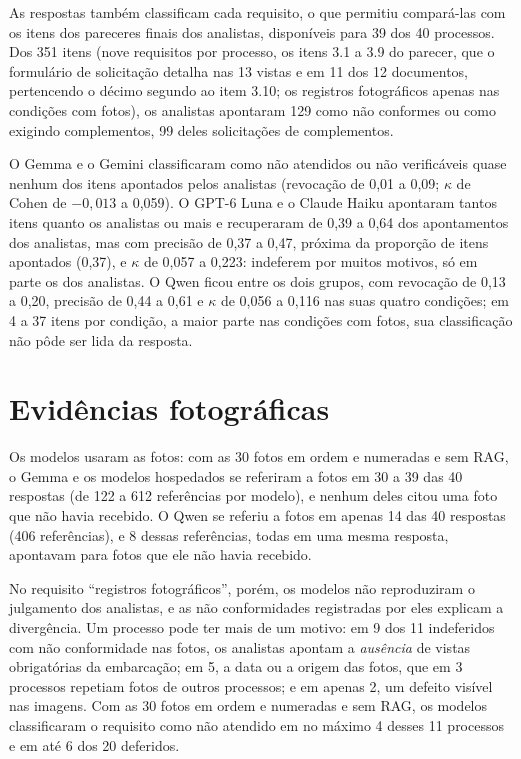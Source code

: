 As respostas também classificam cada requisito, o que permitiu compará-las com os itens dos pareceres finais dos analistas, disponíveis para 39 dos 40 processos. Dos 351 itens (nove requisitos por processo, os itens 3.1 a 3.9 do parecer, que o formulário de solicitação detalha nas 13 vistas e em 11 dos 12 documentos, pertencendo o décimo segundo ao item 3.10; os registros fotográficos apenas nas condições com fotos), os analistas apontaram 129 como não conformes ou como exigindo complementos, 99 deles solicitações de complementos.

O Gemma e o Gemini classificaram como não atendidos ou não verificáveis quase nenhum dos itens apontados pelos analistas (revocação de 0,01 a 0,09; $\kappa$ de Cohen \cite{Cohen1960} de $-0{,}013$ a 0,059). O GPT-6 Luna e o Claude Haiku apontaram tantos itens quanto os analistas ou mais e recuperaram de 0,39 a 0,64 dos apontamentos dos analistas, mas com precisão de 0,37 a 0,47, próxima da proporção de itens apontados (0,37), e $\kappa$ de 0,057 a 0,223: indeferem por muitos motivos, só em parte os dos analistas. O Qwen ficou entre os dois grupos, com revocação de 0,13 a 0,20, precisão de 0,44 a 0,61 e $\kappa$ de 0,056 a 0,116 nas suas quatro condições; em 4 a 37 itens por condição, a maior parte nas condições com fotos, sua classificação não pôde ser lida da resposta.

\section{Evidências fotográficas}
\label{sec:fotos}

Os modelos usaram as fotos: com as 30 fotos em ordem e numeradas e sem RAG, o Gemma e os modelos hospedados se referiram a fotos em 30 a 39 das 40 respostas (de 122 a 612 referências por modelo), e nenhum deles citou uma foto que não havia recebido. O Qwen se referiu a fotos em apenas 14 das 40 respostas (406 referências), e 8 dessas referências, todas em uma mesma resposta, apontavam para fotos que ele não havia recebido.

No requisito ``registros fotográficos'', porém, os modelos não reproduziram o julgamento dos analistas, e as não conformidades registradas por eles explicam a divergência. Um processo pode ter mais de um motivo: em 9 dos 11 indeferidos com não conformidade nas fotos, os analistas apontam a \textit{ausência} de vistas obrigatórias da embarcação; em 5, a data ou a origem das fotos, que em 3 processos repetiam fotos de outros processos; e em apenas 2, um defeito visível nas imagens. Com as 30 fotos em ordem e numeradas e sem RAG, os modelos classificaram o requisito como não atendido em no máximo 4 desses 11 processos e em até 6 dos 20 deferidos.

